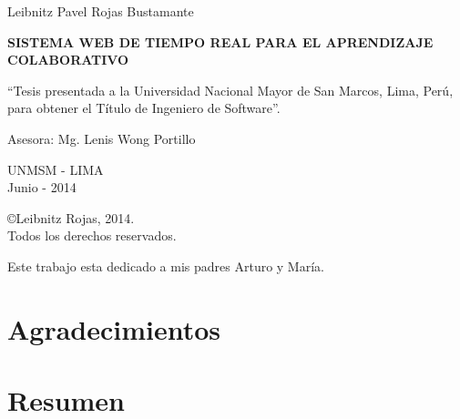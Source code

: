 \newpage
\begin{center}
    Leibnitz Pavel Rojas Bustamante
\end{center}
\vspace*{3cm}
\begin{Large}
\textbf{SISTEMA WEB DE TIEMPO REAL PARA EL APRENDIZAJE COLABORATIVO} \\
\end{Large}
\vspace*{5cm}
\begin{flushright}
    \begin{minipage}{.5\textwidth}
    ``Tesis presentada a la Universidad Nacional Mayor de San Marcos, Lima, Perú, para obtener el Título de Ingeniero de Software''.
    \end{minipage}
    \end{flushright}
\vspace*{3cm}
\begin{flushright}
    \begin{minipage}{.5\textwidth}
    Asesora: Mg. Lenis Wong Portillo
    \end{minipage}
\end{flushright}
\vspace*{3cm}
\begin{center}
    UNMSM - LIMA\\
    Junio - 2014
\end{center}

\newpage
\vspace*{\fill}
\begin{center}
\copyright \hspace{0.2cm}Leibnitz Rojas, 2014.\\
Todos los derechos reservados.
\end{center}

\newpage
\clearpage
\vspace*{\fill}
\begin{flushright}
\begin{minipage}{.5\textwidth}
Este trabajo esta dedicado a mis padres Arturo y María.\\
\end{minipage}
\end{flushright}
\vfill %
\newpage
\chapter*{Agradecimientos}
\chapter*{Resumen}
